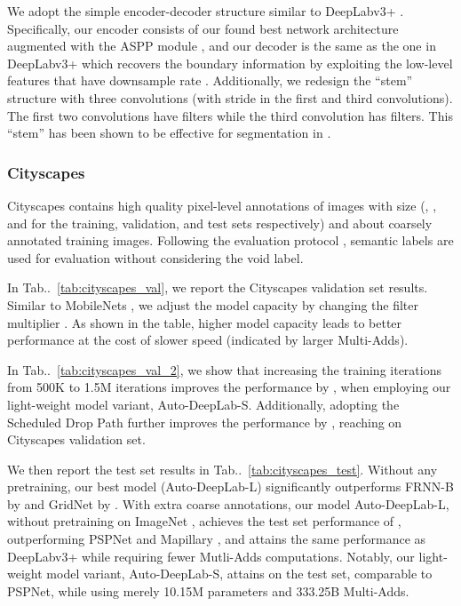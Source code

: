 \documentclass[10pt,twocolumn,letterpaper]{article}
\makeatletter
\def\@onedot{\ifx\@let@token.\else.\null\fi\xspace}
\DeclareRobustCommand\onedot{\futurelet\@let@token\@onedot}
\newcommand{\tabref}[1]{Tab\onedot~\ref{#1}}
\makeatother
\begin{document}
We adopt the simple encoder-decoder structure similar to DeepLabv3+ \cite{deeplabv3plus2018}. Specifically, our encoder consists of our found best network architecture augmented with the ASPP module \cite{chen2017deeplab,chen2017rethinking}, and our decoder is the same as the one in DeepLabv3+ which recovers the boundary information by exploiting the low-level features that have downsample rate . Additionally, we redesign the ``stem'' structure with three  convolutions (with stride  in the first and third convolutions). The first two convolutions have  filters while the third convolution has  filters. This ``stem'' has been shown to be effective for segmentation in \cite{zhao2017pyramid,wang2017understanding}.




 
\vspace{-0.25cm}
\subsubsection{Cityscapes}
\vspace{-0.1cm}

Cityscapes \cite{Cordts2016Cityscapes} contains high quality pixel-level annotations of  images with size  (, , and  for the training, validation, and test sets respectively) and about  coarsely annotated training images. Following the evaluation protocol \cite{Cordts2016Cityscapes},  semantic labels are used for evaluation without considering the void label.

In \tabref{tab:cityscapes_val}, we report the Cityscapes validation set results. Similar to MobileNets \cite{howard2017mobilenets,mobilenetv22018}, we adjust the model capacity by changing the filter multiplier .  As shown in the table, higher model capacity leads to better performance at the cost of slower speed (indicated by larger Multi-Adds).

In \tabref{tab:cityscapes_val_2}, we show that increasing the training iterations from 500K to 1.5M iterations improves the performance by , when employing our light-weight model variant, Auto-DeepLab-S. Additionally, adopting the Scheduled Drop Path \cite{larsson2017fractalnet,zoph2017learning} further improves the performance by , reaching  on Cityscapes validation set.

We then report the test set results in \tabref{tab:cityscapes_test}. Without any pretraining, our best model (Auto-DeepLab-L) significantly outperforms FRNN-B \cite{pohlen2016full} by  and GridNet \cite{fourure2017residual} by . With extra coarse annotations, our model Auto-DeepLab-L, without pretraining on ImageNet \cite{ILSVRC15}, achieves the test set performance of , outperforming PSPNet \cite{zhao2017pyramid} and Mapillary \cite{bulo2017place}, and attains the same performance as DeepLabv3+ \cite{deeplabv3plus2018} while requiring  fewer Mutli-Adds computations. Notably, our light-weight model variant, Auto-DeepLab-S, attains  on the test set, comparable to PSPNet, while using merely 10.15M parameters and 333.25B Multi-Adds.
\end{document}
